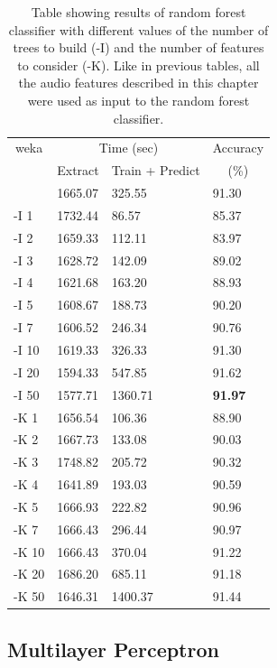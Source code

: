\begin{table}
\begin{tabular}{|l|l|l|l|}
\hline
\multicolumn{1}{|c|}{weka} & \multicolumn{2}{c|}{Time (sec)} & Accuracy \\
\hhline{|~|-|-|~|}
\multicolumn{1}{|c|}{param} & Extract & Train + Predict & \multicolumn{1}{c|}{(\%)} \\
\hhline{|=|=|=|=|}
        &  1665.07  &     325.55  &  91.30  \\
 -I 1   &  1732.44  &      86.57  &  85.37  \\
 -I 2   &  1659.33  &     112.11  &  83.97  \\
 -I 3   &  1628.72  &     142.09  &  89.02  \\
 -I 4   &  1621.68  &     163.20  &  88.93  \\
 -I 5   &  1608.67  &     188.73  &  90.20  \\
 -I 7   &  1606.52  &     246.34  &  90.76  \\
 -I 10  &  1619.33  &     326.33  &  91.30  \\
 -I 20  &  1594.33  &     547.85  &  91.62  \\
 -I 50  &  1577.71  &    1360.71  &  \textbf{91.97}  \\
\hline
 -K 1   &  1656.54  &     106.36  &  88.90  \\
 -K 2   &  1667.73  &     133.08  &  90.03  \\
 -K 3   &  1748.82  &     205.72  &  90.32  \\
 -K 4   &  1641.89  &     193.03  &  90.59  \\
 -K 5   &  1666.93  &     222.82  &  90.96  \\
 -K 7   &  1666.43  &     296.44  &  90.97  \\
 -K 10  &  1666.43  &     370.04  &  91.22  \\
 -K 20  &  1686.20  &     685.11  &  91.18  \\
 -K 50  &  1646.31  &    1400.37  &  91.44  \\
\hline
\end{tabular}
\caption{Table showing results of random forest
  classifier with different values of the number of trees to build
  (-I) and the number of features to consider (-K).  Like in previous
  tables, all the audio features described in this chapter were used
  as input to the random forest classifier.}
\label{table:obv-weka-randomForest}
\end{table}

%
%
\subsection{Multilayer Perceptron}

